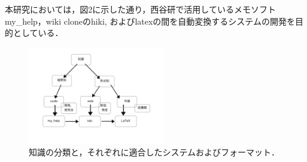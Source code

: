 本研究においては，図2に示した通り，西谷研で活用しているメモソフト
my\_help，wiki cloneのhiki, およびlatexの間を自動変換するシステムの開発を目的としている．

\begin{figure}[htbp]\begin{center}
\includegraphics[width=6cm,bb=0 0 442 500]{../figs/./knowledge_controll_cui.png}
\caption{知識の分類と，それぞれに適合したシステムおよびフォーマット．}
\label{default}\end{center}\end{figure}
